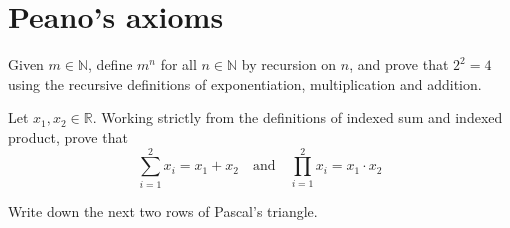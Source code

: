 \section{Peano's axioms}


\begin{exercise}
Given $m \in \mathbb{N}$, define $m^n$ for all $n \in \mathbb{N}$ by recursion on $n$, and prove that $2^2 = 4$ using the recursive definitions of exponentiation, multiplication and addition.
\end{exercise}


\begin{exercise}
Let $x_1, x_2 \in \mathbb{R}$. Working strictly from the definitions of indexed sum and indexed product, prove that
\[ \sum_{i=1}^2 x_i = x_1 + x_2 \quad \text{and} \quad \prod_{i=1}^2 x_i = x_1 \cdot x_2 \]
\end{exercise}


\begin{exercise}
Write down the next two rows of Pascal's triangle.
\end{exercise}